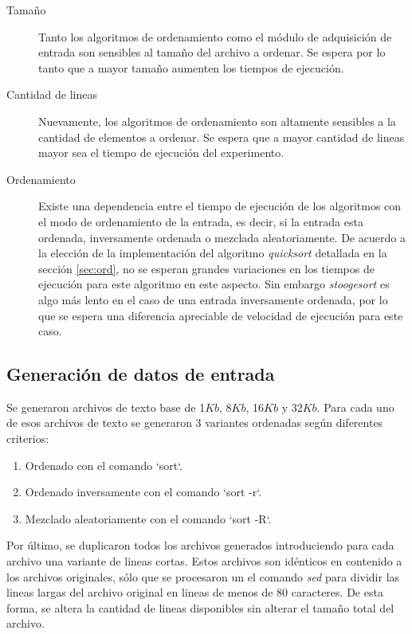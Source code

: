 \documentclass[a4paper,11pt]{article}
\begin{document}
\begin{description}

  \item[Tamaño] Tanto los algoritmos de ordenamiento como el módulo
    de adquisición de entrada son sensibles al tamaño del archivo a ordenar. Se
    espera por lo tanto que a mayor tamaño aumenten los tiempos de ejecución.

  \item[Cantidad de lineas] Nuevamente, los algoritmos de ordenamiento son
    altamente sensibles a la cantidad de elementos a ordenar. Se espera que a
    mayor cantidad de lineas mayor sea el tiempo de ejecución del experimento.

  \item[Ordenamiento] Existe una dependencia entre el tiempo de ejecución de
    los algoritmos con el modo de ordenamiento de la entrada, es decir, si la
    entrada esta ordenada, inversamente ordenada o mezclada aleatoriamente. De
    acuerdo a la elección de la implementación del algoritmo \textit{quicksort}
    detallada en la sección \ref{sec:ord}, no se esperan grandes variaciones en
    los tiempos de ejecución para este algoritmo en este aspecto. Sin embargo
    \textit{stoogesort} es algo más lento en el caso de una entrada
    inversamente ordenada, por lo que se espera una diferencia apreciable de
    velocidad de ejecución para este caso.

\end{description}

\subsection{Generación de datos de entrada}

Se generaron archivos de texto base de 1\(Kb\), 8\(Kb\), 16\(Kb\) y
32\(Kb\). Para cada uno de esos archivos de texto se generaron 3 variantes
ordenadas según diferentes criterios:

\begin{enumerate}
  \item Ordenado con el comando `sort`.
  \item Ordenado inversamente con el comando `sort -r`.
  \item Mezclado aleatoriamente con el comando `sort -R`.
\end{enumerate}

Por último, se duplicaron todos los archivos generados introduciendo para cada
archivo una variante de lineas cortas. Estos archivos son idénticos en
contenido a los archivos originales, sólo que se procesaron un el comando
\textit{sed} \cite{WIKISED} para dividir las lineas largas del archivo original
en lineas de menos de 80 caracteres. De esta forma, se altera la cantidad de
lineas disponibles sin alterar el tamaño total del archivo.
\end{document}
